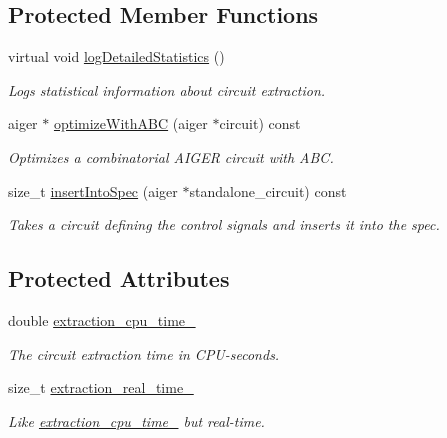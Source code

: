 \subsection*{Protected Member Functions}
\begin{DoxyCompactItemize}
\item 
virtual void \hyperlink{classCNFImplExtractor_abe790c767f6c71a52ef8b0a61ab39eaa}{log\-Detailed\-Statistics} ()
\begin{DoxyCompactList}\small\item\em Logs statistical information about circuit extraction. \end{DoxyCompactList}\item 
aiger $\ast$ \hyperlink{classCNFImplExtractor_a58a4e5021d0ef9c4190a5be74fb5a83e}{optimize\-With\-A\-B\-C} (aiger $\ast$circuit) const 
\begin{DoxyCompactList}\small\item\em Optimizes a combinatorial A\-I\-G\-E\-R circuit with A\-B\-C. \end{DoxyCompactList}\item 
size\-\_\-t \hyperlink{classCNFImplExtractor_a0970602635f3356712d57ebb28d12c0d}{insert\-Into\-Spec} (aiger $\ast$standalone\-\_\-circuit) const 
\begin{DoxyCompactList}\small\item\em Takes a circuit defining the control signals and inserts it into the spec. \end{DoxyCompactList}\end{DoxyCompactItemize}
\subsection*{Protected Attributes}
\begin{DoxyCompactItemize}
\item 
double \hyperlink{classCNFImplExtractor_ab8be06d42fd3c4b569ec22cfcf2f508e}{extraction\-\_\-cpu\-\_\-time\-\_\-}
\begin{DoxyCompactList}\small\item\em The circuit extraction time in C\-P\-U-\/seconds. \end{DoxyCompactList}\item 
size\-\_\-t \hyperlink{classCNFImplExtractor_ae06413cf08f868357d64545b3041aa18}{extraction\-\_\-real\-\_\-time\-\_\-}
\begin{DoxyCompactList}\small\item\em Like \hyperlink{classCNFImplExtractor_ab8be06d42fd3c4b569ec22cfcf2f508e}{extraction\-\_\-cpu\-\_\-time\-\_\-} but real-\/time. \end{DoxyCompactList}\end{DoxyCompactItemize}
